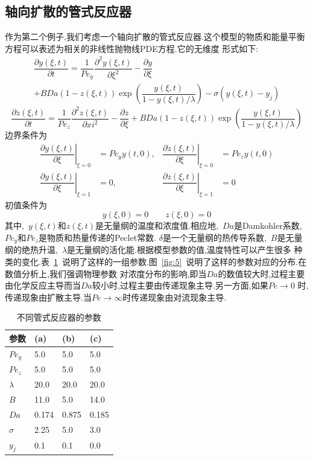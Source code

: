 \documentclass[a4paper,cs4size,adobefonts,cm-default,no-math]{ctexart}
\begin{document}
\subsection{轴向扩散的管式反应器}
作为第二个例子,我们考虑一个轴向扩散的管式反应器.这个模型的物质和能量平衡方程可以表述为相关的非线性抛物线PDE方程.它的无维度
形式如下:
\begin{multline}\label{eq:27}
 \dfrac{\partial y(\xi,t)}{\partial t} = \dfrac{1}{Pe_y}\dfrac{\partial^2 y(\xi,t)}{\partial \xi^2}
 -\dfrac{\partial y}{\partial \xi} \\
 +BDa(1-z(\xi,t))\exp\left(\dfrac{y(\xi,t)}{1-y(\xi,t)/\lambda}\right)-\sigma(y(\xi,t)-y_j)
\end{multline}
\begin{equation}\label{eq:28}
 \dfrac{\partial z(\xi,t)}{\partial t}=\dfrac{1}{Pe_z}\dfrac{\partial^2 z(\xi,t)}{\partial xi^2}
 -\dfrac{\partial z}{\partial \xi}+BDa(1-z(\xi,t))\exp\left(\dfrac{y(\xi,t)}{1-y(\xi,t)/\lambda}\right)
\end{equation}
边界条件为
\begin{align*}
\left.\dfrac{\partial y(\xi,t)}{\partial \xi}\right|_{\xi=0}&=Pe_yy(t,0), & \left.\dfrac{\partial z(\xi,t)}{\partial \xi}\right|_{\xi=0}&=Pe_zy(t,0)\\
\left.\dfrac{\partial y(\xi,t)}{\partial \xi}\right|_{\xi=1}&=0, & \left.\dfrac{\partial z(\xi,t)}{\partial \xi}\right|_{\xi=1}&=0
\end{align*}
初值条件为
\begin{equation*}
 y(\xi,0)=0 \qquad z(\xi,0)=0
\end{equation*}
其中,~$y(\xi,t)$和$z(\xi,t)$是无量纲的温度和浓度值.相应地,~$Da$是Damkohler系数,~$Pe_y$和$Pe_z$是物质和热量传递的Peclet常数.
$\delta$是一个无量纲的热传导系数,~$B$是无量纲的绝热升温,~$\lambda$是无量纲的活化能.根据模型参数的值,温度特性可以产生很多
种类的变化.表~\ref{tab:1}~说明了这样的一组参数.图~\ref{fig:5}~说明了这样的参数对应的分布.在数值分析上,我们强调物理参数
对浓度分布的影响,即当$Da$的数值较大时,过程主要由化学反应主导而当$Da$较小时,过程主要由传递现象主导.另一方面,如果$Pe\rightarrow0$
时,传递现象由扩散主导.当$Pe\rightarrow \infty$时传递现象由对流现象主导.
\begin{table}[hbtp]
\caption{不同管式反应器的参数\label{tab:1}}
\begin{tabularx}{\textwidth}{XXXX}
\toprule
参数  	  &  (a)	&  (b) 		 &  (c)   	\\
\midrule
$Pe_y$    &  5.0	&  5.0		 &  5.0	 	\\
$Pe_z$	  &  5.0        &  5.0  	 &  5.0   	\\
$\lambda$ &  20.0	&  20.0 	 &  20.0	\\
$B$	  &  11.0	&  5.0		 &  14.0	\\
$Da$	  &  0.174	&  0.875	 &  0.185	\\
$\sigma$  &  2.25	&  5.0		 &  3.0		\\
$y_j$	  &  0.1	&  0.1		 &  0.0		\\
\bottomrule
\end{tabularx}
\end{table}
\end{document}

